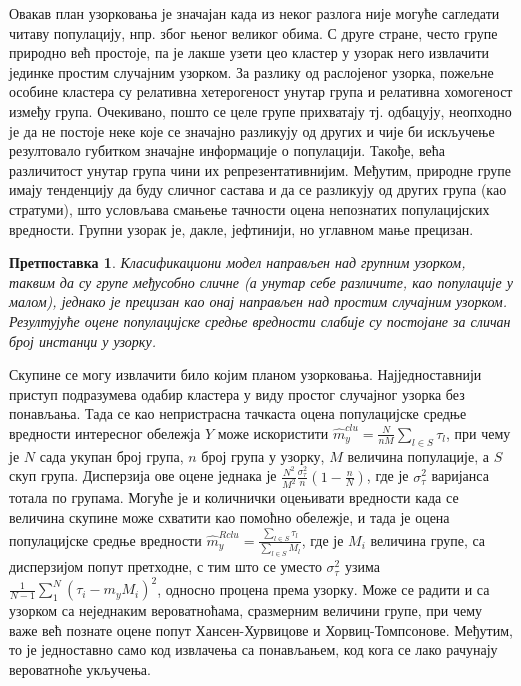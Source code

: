 \documentclass[a4paper]{article}
\newtheorem{hipoteza}{Претпоставка}
\begin{document}
Овакав план узорковања је значајан када из неког разлога није могуће сагледати читаву популацију, нпр. због њеног великог обима. С друге стране, често групе природно већ простоје, па је лакше узети цео кластер у узорак него извлачити јединке простим случајним узорком. За разлику од раслојеног узорка, пожељне особине кластера су релативна хетерогеност унутар група и релативна хомогеност између група. Очекивано, пошто се целе групе прихватају тј. одбацују, неопходно је да не постоје неке које се значајно разликују од других и чије би искључење резултовало губитком значајне информације о популацији. Такође, већа различитост унутар група чини их репрезентативнијим. Међутим, природне групе имају тенденцију да буду сличног састава и да се разликују од других група (као стратуми), што условљава смањење тачности оцена непознатих популацијских вредности. Групни узорак је, дакле, јефтинији, но углавном мање прецизан.

\begin{hipoteza}
Класификациони модел направљен над групним узорком, таквим да су групе међусобно сличне (а унутар себе различите, као популације у малом), једнако је прецизан као онај направљен над простим случајним узорком. Резултујуће оцене популацијске средње вредности слабије су постојане за сличан број инстанци у узорку.
\end{hipoteza}

Скупине се могу извлачити било којим планом узорковања. Најједноставнији приступ подразумева одабир кластера у виду простог случајног узорка без понављања. Тада се као непристрасна тачкаста оцена популацијске средње вредности интересног обележја $Y$ може искористити $\hat{m}_y^{clu} = \frac{N}{nM} \sum_{l \in S} \tau_l$, при чему је $N$ сада укупан број група, $n$ број група у узорку, $M$ величина популације, а $S$ скуп група. Дисперзија ове оцене једнака је $\frac{N^2}{M^2} \frac{\sigma_\tau^2}{n} (1 - \frac{n}{N})$, где је $\sigma_\tau^2$ варијанса тотала по групама. Могуће је и количнички оцењивати вредности када се величина скупине може схватити као помоћно обележје, и тада је оцена популацијске средње вредности $\hat{m}_y^{Rclu} = \frac{\sum_{l \in S} \tau_l}{\sum_{l \in S} M_l}$, где је $M_i$ величина групе, са дисперзијом попут претходне, с тим што се уместо $\sigma_\tau^2$ узима $\frac{1}{N-1} \sum_1^N (\tau_i - m_y M_i)^2$, односно процена према узорку. Може се радити и са узорком са неједнаким вероватноћама, сразмерним величини групе, при чему важе већ познате оцене попут Хансен-Хурвицове и Хорвиц-Томпсонове. Међутим, то је једноставно само код извлачења са понављањем, код кога се лако рачунају вероватноће укључења.
\end{document}
